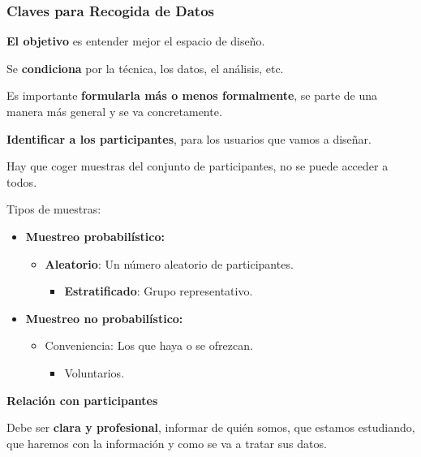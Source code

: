 \hypertarget{claves-para-recogida-de-datos}{%
\subsubsection{Claves para Recogida de
Datos}\label{claves-para-recogida-de-datos}}

\textbf{El objetivo} es entender mejor el espacio de diseño.

Se \textbf{condiciona} por la técnica, los datos, el análisis, etc.

Es importante \textbf{formularla más o menos formalmente}, se parte de
una manera más general y se va concretamente.

\textbf{Identificar a los participantes}, para los usuarios que vamos a
diseñar.

Hay que coger muestras del conjunto de participantes, no se puede
acceder a todos.

Tipos de muestras:

\begin{itemize}
\tightlist
\item
  \textbf{Muestreo probabilístico:}

  \begin{itemize}
  \tightlist
  \item
    \textbf{Aleatorio}: Un número aleatorio de participantes.

    \begin{itemize}
    \tightlist
    \item
      \textbf{Estratificado}: Grupo representativo.
    \end{itemize}
  \end{itemize}
\item
  \textbf{Muestreo no probabilístico:}

  \begin{itemize}
  \tightlist
  \item
    Conveniencia: Los que haya o se ofrezcan.

    \begin{itemize}
    \tightlist
    \item
      Voluntarios.
    \end{itemize}
  \end{itemize}
\end{itemize}

\textbf{Relación con participantes}

Debe ser \textbf{clara y profesional}, informar de quién somos, que
estamos estudiando, que haremos con la información y como se va a tratar
sus datos.

